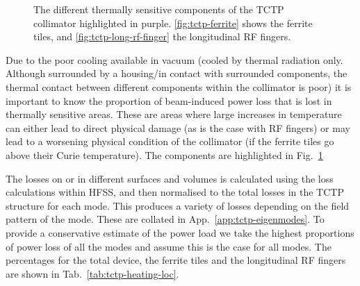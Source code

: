 \begin{figure}
\caption{The different thermally sensitive components of the TCTP collimator highlighted in purple. \ref{fig:tctp-ferrite} shows the ferrite tiles, and \ref{fig:tctp-long-rf-finger} the longitudinal RF fingers.}
\label{fig:tctp-heat-loc}
\end{figure}

Due to the poor cooling available in vacuum (cooled by thermal radiation only. Although surrounded by a housing/in contact with surrounded components, the thermal contact between different components within the collimator is poor) it is important to know the proportion of beam-induced power loss that is lost in thermally sensitive areas. These are areas where large increases in temperature can either lead to direct physical damage (as is the case with RF fingers) or may lead to a worsening physical condition of the collimator (if the ferrite tiles go above their Curie temperature). The components are highlighted in Fig.~\ref{fig:tctp-heat-loc}

The losses on or in different surfaces and volumes is calculated using the loss calculations within HFSS, and then normalised to the total losses in the TCTP structure for each mode. This produces a variety of losses depending on the field pattern of the mode. These are collated in App.~\ref{app:tctp-eigenmodes}. To provide a conservative estimate of the power load we take the highest proportions of power loss of all the modes and assume this is the case for all modes. The percentages for the total device, the ferrite tiles and the longitudinal RF fingers are shown in Tab.~\ref{tab:tctp-heating-loc}. 

